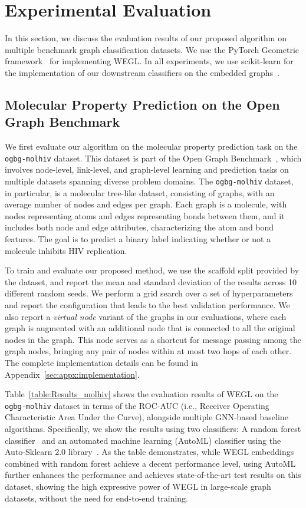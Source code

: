 \documentclass[table]{article} \usepackage{iclr2021_conference,times}
\begin{document}
\section{Experimental Evaluation}
In this section, we discuss the evaluation results of our proposed algorithm on multiple benchmark graph classification datasets. We use the PyTorch Geometric framework~\citep{Fey/Lenssen/2019} for implementing WEGL. In all experiments, we use scikit-learn for the implementation of our downstream classifiers on the embedded graphs~\citep{sklearn_api}. 

\subsection{Molecular Property Prediction on the Open Graph Benchmark}

We first evaluate our algorithm on the molecular property prediction task on the \texttt{ogbg-molhiv} dataset. This dataset is part of the Open Graph Benchmark~\citep{hu2020open}, which involves node-level, link-level, and graph-level learning and prediction tasks on multiple datasets spanning diverse problem domains. The \texttt{ogbg-molhiv} dataset, in particular, is a molecular tree-like dataset, consisting of  graphs, with an average number of  nodes and  edges per graph. Each graph is a molecule, with nodes representing atoms and edges representing bonds between them, and it includes both node and edge attributes, characterizing the atom and bond features. The goal is to predict a binary label indicating whether or not a molecule inhibits HIV replication.

To train and evaluate our proposed method, we use the scaffold split provided by the dataset, and report the mean and standard deviation of the results across 10 different random seeds. We perform a grid search over a set of hyperparameters and report the configuration that leads to the best validation performance. We also report a \emph{virtual node} variant of the graphs in our evaluations, where each graph is augmented with an additional node that is connected to all the original nodes in the graph. This node serves as a shortcut for message passing among the graph nodes, bringing any pair of nodes within at most two hops of each other. The complete implementation details can be found in Appendix~\ref{sec:appx:implementation}.

Table~\ref{table:Results_molhiv} shows the evaluation results of WEGL on the \texttt{ogbg-molhiv} dataset in terms of the ROC-AUC (i.e., Receiver Operating Characteristic Area Under the Curve), alongside multiple GNN-based baseline algorithms. Specifically, we show the results using two classifiers: A random forest classifier~\citep{breiman2001random} and an automated machine learning (AutoML) classifier using the Auto-Sklearn 2.0 library~\citep{feurer2020auto}. As the table demonstrates, while WEGL embeddings combined with random forest achieve a decent performance level, using AutoML further enhances the performance and achieves state-of-the-art test results on this dataset, showing the high expressive power of WEGL in large-scale graph datasets, without the need for end-to-end training.
\end{document}
